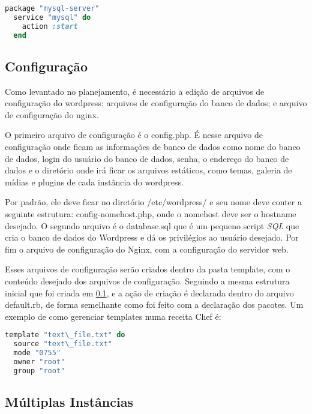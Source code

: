 \begin{lstlisting}[language=Ruby,label=dice_index,caption={Exemplo de criação de serviço do mysql com o chef}]
  package "mysql-server"
  service "mysql" do
    action :start
  end
\end{lstlisting}


\subsection{Configuração}
\label{wordpress:preparacao}

Como levantado no planejamento, é necessário a edição de arquivos de configuração
do wordpress; arquivos de configuração do banco de dados; e arquivo de configuração
do nginx.

O primeiro arquivo de configuração é o config.php. É nesse arquivo de
configuração onde ficam as informações de banco de dados como nome do banco de dados,
login do usuário do banco de dados, senha, o endereço do banco de dados e o diretório
onde irá ficar os arquivos estáticos, como temas, galeria de mídias e plugins 
de cada instância do wordpress.

Por padrão, ele deve ficar no diretório /etc/wordpress/ e seu nome deve conter
a seguinte estrutura: config-nomehost.php, onde o nomehost deve ser o hostname
desejado. O segundo arquivo é o database.sql que é um pequeno script \textit{SQL} que
cria o banco de dados do Wordpress e dá os privilégios ao usuário desejado. Por fim
o arquivo de configuração do Nginx, com a configuração do servidor web.

Esses arquivos de configuração serão criados dentro da pasta template, com o conteúdo
desejado dos arquivos de configuração. Seguindo a mesma estrutura
inicial que foi criada em \ref{wordpress:preparacao}, e a ação de criação é
declarada dentro do arquivo default.rb, de forma semelhante como foi feito com
a declaração dos pacotes. Um exemplo de como gerenciar templates numa receita Chef
é:

\begin{lstlisting}[language=Ruby,label=dice_index,caption={Exemplo de criação de templates com o chef}]
  template "text\_file.txt" do
  source "text\_file.txt"
  mode "0755"
  owner "root"
  group "root"
\end{lstlisting}

\subsection{Múltiplas Instâncias}

